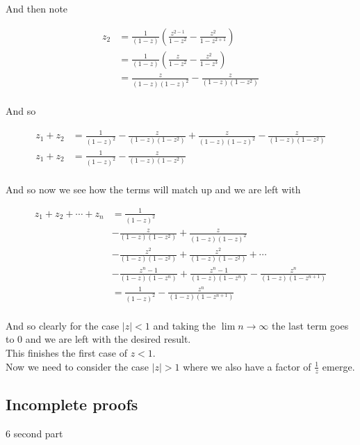 \begin{enumerate}
	And then note

	\begin{align*}
		z_2 &= \frac{1}{(1 - z)} \left( \frac{z^{2 - 1}}{1 - z^{2}} - \frac{z^2}{1 - z^{2 + 1}} \right) \\
		&= \frac{1}{(1 - z)} \left( \frac{z}{1 - z^2} - \frac{z^2}{1 - z^{3}} \right) \\
		&= \frac{z}{(1 - z)(1 - z)^2} - \frac{z}{(1 - z)(1 - z^{2})} \\
	\end{align*}

	And so 

	\begin{align*}
		z_1 + z_2 &= \frac{1}{(1 - z)^2} - \frac{z}{(1 - z)(1 - z^{2})} + \frac{z}{(1 - z)(1 - z)^2} - \frac{z}{(1 - z)(1 - z^{2})} \\
		z_1 + z_2 &= \frac{1}{(1 - z)^2} - \frac{z}{(1 - z)(1 - z^{2})} \\
	\end{align*}

	And so now we see how the terms will match up and we are left with

	\begin{align*}
		z_1 + z_2 + \cdots + z_n &= \frac{1}{(1 - z)^2} \\
		&- \frac{z}{(1 - z)(1 - z^{2})} + \frac{z}{(1 - z)(1 - z)^2} \\
		&- \frac{z^2}{(1 - z)(1 - z^{2})} + \frac{z^2}{(1 - z)(1 - z^{2})} + \cdots \\
		&- \frac{z^n-1}{(1 - z)(1 - z^{n})} +\frac{z^n-1}{(1 - z)(1 - z^{n})} - \frac{z^n}{(1 - z)(1 - z^{n + 1})} \\
		&= \frac{1}{(1 - z)^2} - \frac{z^n}{(1 - z)(1 - z^{n + 1})} \\
	\end{align*}

	And so clearly for the case $|z| < 1$ and taking the $\lim n \to \infty$ the last term goes to $0$ and we are left 
	with the desired result. \\

	This finishes the first case of $z < 1$.\\

	Now we need to consider the case $|z| > 1$ where we also have a factor of $\frac{1}{z}$ emerge.
\end{enumerate}

\subsection{Incomplete proofs}
6 second part

